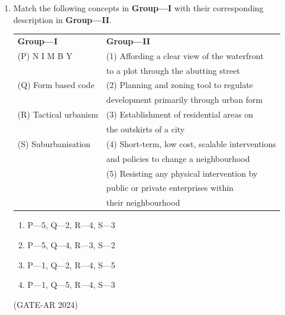 \documentclass[a4paper,10pt]{article}
\begin{document}
\begin{enumerate}
    \item Match the following concepts in \textbf{Group—I} with their corresponding description in \textbf{Group—II}. \\
    \begin{tabular}{ l l }
    \textbf{Group—I} & \textbf{Group—II} \\
    (P) N I M B Y & (1) Affording a clear view of the waterfront \\
    & to a plot through the abutting street \\
    (Q) Form based code & (2) Planning and zoning tool to regulate \\
    & development primarily through urban form \\
    (R) Tactical urbanism & (3) Establishment of residential areas on \\
    & the outskirts of a city \\
    (S) Suburbanisation & (4) Short-term, low cost, scalable interventions \\
    & and policies to change a neighbourhood \\
    & (5) Resisting any physical intervention by \\
    & public or private enterprises within \\
    & their neighbourhood \\
    \end{tabular}
    \begin{multicols}{2}
    \begin{enumerate}
        \item P—5, Q—2, R—4, S—3
        \item P—5, Q—4, R—3, S—2
        \item P—1, Q—2, R—4, S—5
        \item P—1, Q—5, R—4, S—3
    \end{enumerate}
    \end{multicols}
    \hfill (GATE-AR 2024)


\end{enumerate}
\end{document}
